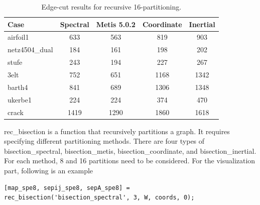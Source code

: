 \documentclass[unicode,11pt,a4paper,oneside,numbers=endperiod,openany]{scrartcl}
\begin{document}
\begin{table}[htbp]
    \centering
    \caption{Edge-cut results for recursive 16-partitioning.}
    \label{tab:edgecut_16partitioning}
    \begin{tabular}{lcccc}
        \toprule
        \textbf{Case} & \textbf{Spectral} & \textbf{Metis 5.0.2} & \textbf{Coordinate} & \textbf{Inertial} \\
        \midrule
        airfoil1         & 633 & 563 & 819  & 903  \\
        netz4504\_dual   & 184 & 161 & 198  & 202  \\
        stufe            & 243 & 194 & 227  & 267  \\
        3elt             & 752 & 651 & 1168 & 1342 \\
        barth4           & 841 & 689 & 1306 & 1348 \\
        ukerbe1          & 224 & 224 & 374  & 470  \\
        crack            & 1419 & 1290 & 1860 & 1618 \\
        \bottomrule
    \end{tabular}
\end{table}
rec\_bisection is a function that recursively partitions a graph. It requires specifying different partitioning methods. There are four types of bisection\_spectral, bisection\_metis, bisection\_coordinate, and bisection\_inertial. For each method, 8 and 16 partitions need to be considered. For the visualization part, following is an example
\begin{lstlisting}[language=MyMATLAB, style=mystyle, caption={Recursive Bisection with Spectral Partitioning}]
    [map_spe8, sepij_spe8, sepA_spe8] = rec_bisection('bisection_spectral', 3, W, coords, 0);
\end{lstlisting}
\end{document}

